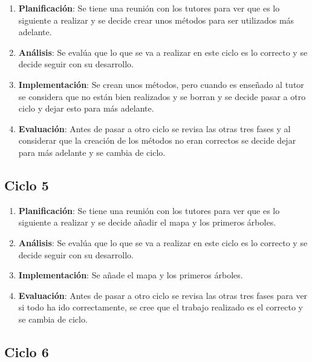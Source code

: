 \begin{enumerate}
	\item \textbf{Planificación}: Se tiene una reunión con los tutores para ver que es lo siguiente a realizar y se decide crear unos métodos para ser utilizados más adelante.
	\item \textbf{Análisis}: Se evalúa que lo que se va a realizar en este ciclo es lo correcto y se decide seguir con su desarrollo.
	\item \textbf{Implementación}: Se crean unos métodos, pero cuando es enseñado al tutor se considera que no están bien realizados y se borran y se decide pasar a otro ciclo y dejar esto para más adelante.
	\item \textbf{Evaluación}: Antes de pasar a otro ciclo se revisa las otras tres fases y al considerar que la creación de los métodos no eran correctos se decide dejar para más adelante y se cambia de ciclo.
\end{enumerate}

\subsection{Ciclo 5}

\begin{enumerate}
	\item \textbf{Planificación}: Se tiene una reunión con los tutores para ver que es lo siguiente a realizar y se decide añadir el mapa y los primeros árboles.
	\item \textbf{Análisis}: Se evalúa que lo que se va a realizar en este ciclo es lo correcto y se decide seguir con su desarrollo.
	\item \textbf{Implementación}: Se añade el mapa y los primeros árboles.
	\item \textbf{Evaluación}: Antes de pasar a otro ciclo se revisa las otras tres fases para ver si todo ha ido correctamente, se cree que el trabajo realizado es el correcto y se cambia de ciclo.
\end{enumerate}

\subsection{Ciclo 6}

